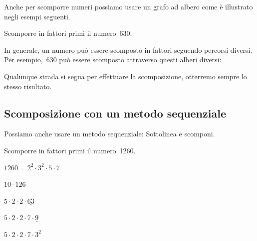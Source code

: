 Anche per scomporre numeri possiamo usare un grafo ad albero come è 
illustrato negli esempi seguenti.


\begin{inaccessibleblock}[]
\begin{esempio}{}{}
Scomporre in fattori primi il numero~630.

\vspace{-1em}
\begin{center} \scompa \end{center}
% 
\end{esempio}
\end{inaccessibleblock}

In generale, un numero può essere scomposto in fattori seguendo percorsi 
diversi. Per esempio,~630 può essere scomposto attraverso questi alberi
diversi:

\begin{inaccessibleblock}[]
\begin{minipage}{0.40\textwidth}
\begin{center} \scompb \end{center}
% 
\end{minipage}%
\begin{minipage}{0.40\textwidth}
\begin{center} \scompc \end{center}
% 
\end{minipage}%
\end{inaccessibleblock}


Qualunque strada si segua per effettuare la scomposizione, 
otterremo sempre lo stesso risultato.

\subsection{Scomposizione con un metodo sequenziale}

Possiamo anche usare un metodo sequenziale:
Sottolinea e scomponi.

 \begin{esempio}{}{}
 Scomporre in fattori primi il numero~1260.

\vspace{.5em}
 \(\underline{1260} = 2^{2} \cdot 3^{2} \cdot 5 \cdot 7\)
 
 \(\underline{10} \cdot \underline{126}\)
 
 \(5 \cdot 2 \cdot 2 \cdot \underline{63}\)
 
 \(5 \cdot 2 \cdot 2 \cdot 7 \cdot \underline{9}\)
 
 \(5 \cdot 2 \cdot 2 \cdot 7 \cdot 3^{2}\)
 
 \end{esempio}


